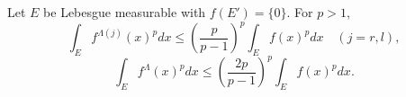 Let $E$ be Lebesgue measurable with $f(E') = \{0\}$. For $p > 1$,
$$\int_E f^{\Lambda(j)}(x)^p dx \leq \left(\frac{p}{p-1}\right)^p \int_E f(x)^p dx \quad (j=r,l),$$
$$\int_E f^\Lambda(x)^p dx \leq \left(\frac{2p}{p-1}\right)^p \int_E f(x)^p dx.$$
